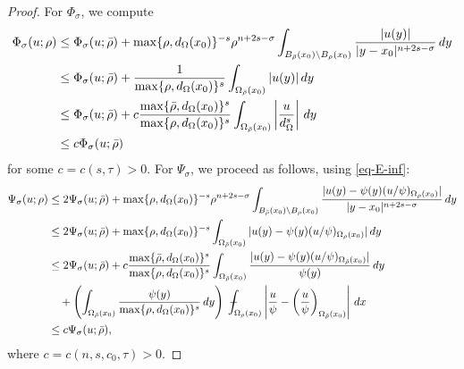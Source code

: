 \documentclass[11pt,reqno]{amsart}
\theoremstyle{plain}
\theoremstyle{definition}
\numberwithin{equation}{section}
\newcommand{\1}{\mathbbm{1}}
\renewcommand{\d}{\textnormal{\,d}}
\newcommand{\average}{{\mathchoice {\kern1ex\vcenter{\hrule height.4pt
width 6pt depth0pt} \kern-9.7pt} {\kern1ex\vcenter{\hrule
height.4pt width 4.3pt depth0pt} \kern-7pt} {} {} }}
\newcommand{\dashint}{\average\int}
\begin{document}
\begin{proof}
For $\Phi_{\sigma}$, we compute
\begin{align}
\label{eq-almost-incr-Phi}
\begin{split}
\Phi_{\sigma}(u; \rho)
&\leq \Phi_{\sigma}(u; \bar{\rho}) + \max\{\rho,d_{\Omega}(x_0)\}^{-s} \rho^{n+2s-\sigma} \int_{B_{\bar{\rho}}(x_0) \setminus B_\rho(x_0)} \frac{|u(y)|}{|y-x_0|^{n+2s-\sigma}} \d y \\
&\leq \Phi_{\sigma}(u; \bar{\rho}) + \frac{1}{\max\{\rho, d_\Omega(x_0)\}^s} \int_{\Omega_{\bar{\rho}}(x_0)} |u(y)| \d y \\
&\leq \Phi_{\sigma}(u; \bar{\rho}) + c\frac{\max\{\bar{\rho}, d_\Omega(x_0)\}^s}{\max\{\rho, d_\Omega(x_0)\}^s} \int_{\Omega_{\bar{\rho}}(x_0)} \left| \frac{u}{d_\Omega^s} \right| \d y \\
&\leq c\Phi_{\sigma}(u; \bar{\rho})
\end{split}
\end{align}
for some $c=c(s,\tau)>0$.
    For $\Psi_{\sigma}$, we proceed as follows,  using \eqref{eq-E-inf}:
    \begin{align}
    \label{eq-almost-incr-Psi}
    \begin{split}
        \Psi_{\sigma}(u; \rho)
        &\leq 2\Psi_{\sigma}(u; \bar{\rho}) + \max\{\rho, d_\Omega(x_0)\}^{-s} \rho^{n+2s-\sigma} \int_{B_{\bar{\rho}}(x_0) \setminus B_\rho(x_0)} \frac{|u(y)-\psi(y)(u/\psi)_{\Omega_\rho(x_0)}|}{|y-x_0|^{n+2s-\sigma}} \d y \\
        & \leq 2\Psi_{\sigma}(u; \bar{\rho}) + \max\{\rho, d_\Omega(x_0)\}^{-s} \int_{\Omega_{\bar{\rho}}(x_0)} |u(y)-\psi(y)(u/\psi)_{\Omega_\rho(x_0)}| \d y \\
        &\leq 2\Psi_{\sigma}(u; \bar{\rho}) + c\frac{\max\{\bar{\rho}, d_\Omega(x_0)\}^s}{\max\{\rho, d_\Omega(x_0)\}^s} \int_{\Omega_{\bar{\rho}}(x_0)} \frac{|u(y)-\psi(y)(u/\psi)_{\Omega_{\bar{\rho}}(x_0)}|}{\psi(y)} \d y \\
        &\quad + \left( \int_{\Omega_{\bar{\rho}}(x_0)} \frac{\psi(y)}{\max\{\rho, d_\Omega(x_0)\}^{s}} \d y \right) \dashint_{\Omega_\rho(x_0)} \left|\frac{u}{\psi} - \left(\frac{u}{\psi} \right)_{\Omega_{\bar{\rho}}(x_0)} \right|\d x\\
        &\leq c\Psi_{\sigma}(u; \bar{\rho}),
        \end{split}
    \end{align}
    where $c=c(n, s, c_0, \tau)>0$.
\end{proof}
\end{document}
